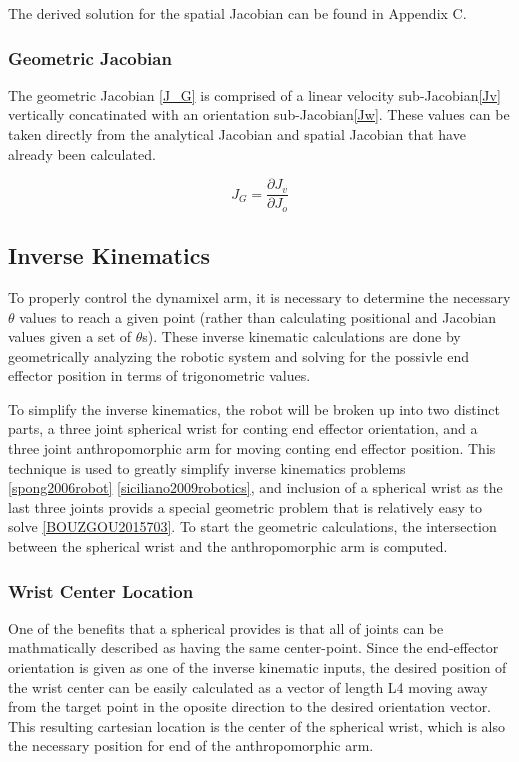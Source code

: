 \documentclass[10pt,journal]{IEEEtran}
\begin{document}
The derived solution for the spatial Jacobian can be found in Appendix C.

\subsubsection{Geometric Jacobian}
The geometric Jacobian \ref{J_G} is comprised of a linear velocity sub-Jacobian\ref{Jv} vertically concatinated with an orientation sub-Jacobian\ref{Jw}. These values can be taken directly from the analytical Jacobian and spatial Jacobian that have already been calculated.

\begin{equation}\label{J_G}
	J_G = \frac{\partial J_v}{\partial J_o}
\end{equation}

\subsection{Inverse Kinematics}
To properly control the dynamixel arm, it is necessary to determine the necessary $\theta$ values to reach a given point (rather than calculating positional and Jacobian values given a set of $\theta$s). These inverse kinematic calculations are done by geometrically analyzing the robotic system and solving for the possivle end effector position in terms of trigonometric values. \par To simplify the inverse kinematics, the robot will be broken up into two distinct parts, a three joint spherical wrist for conting end effector orientation, and a three joint anthropomorphic arm for moving conting end effector position. This technique is used to greatly simplify inverse kinematics problems \ref{spong2006robot} \ref{siciliano2009robotics}, and inclusion of a spherical wrist as the last three joints provids a special geometric problem that is relatively easy to solve \ref{BOUZGOU2015703}. To start the geometric calculations, the intersection between the spherical wrist and the anthropomorphic arm is computed.

\subsubsection{Wrist Center Location}
One of the benefits that a spherical provides is that all of joints can be mathmatically described as having the same center-point. Since the end-effector orientation is given as one of the inverse kinematic inputs, the desired position of the wrist center can be easily calculated as a vector of length L4 moving away from the target point in the oposite direction to the desired orientation vector. This resulting cartesian location is the center of the spherical wrist, which is also the necessary position for end of the anthropomorphic arm.
\end{document}
